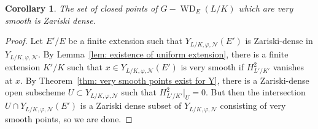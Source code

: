 \documentclass{amsart}
\newtheorem{cor}[subsubsection]{Corollary}
\theoremstyle{definition}
\theoremstyle{remark}
\newcommand{\mar}[1]{}
\newcommand{\mar}[1]{\marginpar{\raggedright\tiny squirrel #1}}
\DeclareMathOperator{\WD}{WD}
\begin{document}
\begin{cor}\label{cor: WD stack is generically very smooth zero dimensional
  controlled by H2}%
  The set of closed points of $G-\WD_E(L/K)$ which are very smooth is
  Zariski dense. %
\end{cor}
\begin{proof}
Let $E'/E$ be a finite extension such that $Y_{L/K,\varphi,\mathcal N}(E')$ is Zariski-dense in $Y_{L/K,\varphi,\mathcal N}$.  By Lemma~\ref{lem: existence of uniform extension}, there is a finite extension $K'/K$ such that $x\in Y_{L/K,\varphi,\mathcal N}(E')$ is very smooth if $H_{L'/K'}^2$ vanishes at $x$.  By Theorem~\ref{thm: very smooth points exist for Y}, there is a Zariski-dense open subscheme $U\subset Y_{L/K,\varphi,\mathcal N}$ such that $H_{L'/K'}^2|_{U}=0$.  But then the intersection $U\cap Y_{L/K,\varphi,\mathcal N}(E')$ is a Zariski dense subset of $Y_{L/K,\varphi,\mathcal N}$ consisting of very smooth points, so we are done.
%
%
\end{proof}
\end{document}
